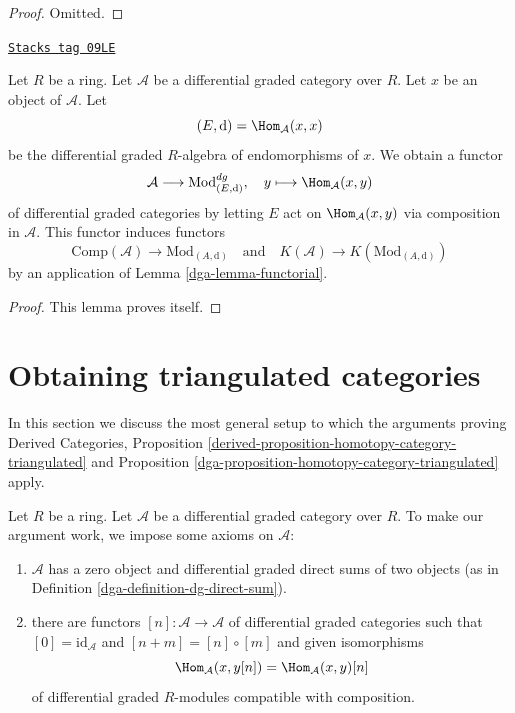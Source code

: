 \begin{proof}
Omitted.
\end{proof}

\begin{lemma}[Construction]
\label{dga-lemma-construction}
\href{https://stacks.math.columbia.edu/tag/09LE}{\texttt{Stacks tag 09LE}}

Let $R$ be a ring. Let $\mathcal{A}$ be a differential graded category
over $R$. Let $x$ be an object of $\mathcal{A}$. Let
$$
(E, \text{d}) = \Hom_\mathcal{A}(x, x)
$$
be the differential graded $R$-algebra of endomorphisms of $x$.
We obtain a functor
$$
\mathcal{A} \longrightarrow \text{Mod}^{dg}_{(E, \text{d})},\quad
y \longmapsto \Hom_\mathcal{A}(x, y)
$$
of differential graded categories by letting $E$ act on
$\Hom_\mathcal{A}(x, y)$ via composition in $\mathcal{A}$.
This functor induces functors
$$
\text{Comp}(\mathcal{A}) \to \text{Mod}_{(A, \text{d})}
\quad\text{and}\quad
K(\mathcal{A}) \to K(\text{Mod}_{(A, \text{d})})
$$
by an application of Lemma \ref{dga-lemma-functorial}.
\end{lemma}

\begin{proof}
This lemma proves itself.
\end{proof}

\section{Obtaining triangulated categories}
\label{dga-section-review}
In this section we discuss the most general setup to which the arguments
proving Derived Categories, Proposition
\ref{derived-proposition-homotopy-category-triangulated} and
Proposition \ref{dga-proposition-homotopy-category-triangulated} apply.

\medskip\noindent
Let $R$ be a ring. Let $\mathcal{A}$ be a differential graded category
over $R$. To make our argument work, we impose some axioms on $\mathcal{A}$:
\begin{enumerate}
\item[(A)] $\mathcal{A}$ has a zero object and differential
graded direct sums of two objects
(as in Definition \ref{dga-definition-dg-direct-sum}).
\item[(B)] there are functors $[n] : \mathcal{A} \longrightarrow \mathcal{A}$
of differential graded categories such that
$[0] = \text{id}_\mathcal{A}$ and $[n + m] = [n] \circ [m]$
and given isomorphisms
$$
\Hom_\mathcal{A}(x, y[n]) = \Hom_\mathcal{A}(x, y)[n]
$$
of differential graded $R$-modules compatible with composition.
\end{enumerate}

